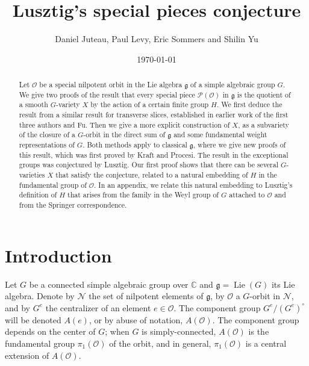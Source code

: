 \documentclass{amsart}
\title{Lusztig's special pieces conjecture}
\author{Daniel Juteau, Paul Levy, Eric Sommers and Shilin Yu}
\date{\today}
\theoremstyle{definition}
\DeclareMathOperator{\Lie}{Lie}
\newcommand{\C}{\mathbb{C}}
\newcommand{\g}{\mathfrak{g}}
\newcommand{\0}{\mathcal{O}}
\newcommand{\com}[1]{\textcolor{red}{#1}}
\begin{document}
\begin{abstract}
Let $\0$ be a special nilpotent orbit in the Lie algebra $\g$ of a simple algebraic group $G$.
We give two proofs of the result that every special piece ${\mathcal P}(\0)$ in $\g$
is the quotient of a smooth $G$-variety $X$ by the action of a certain finite group $H$.  
We first deduce the result from a similar result for transverse slices, established in earlier work of the first three authors and Fu.
Then we give a more explicit construction of $X$, as a subvariety of the closure of a $G$-orbit
in the direct sum of $\g$ and some fundamental weight representations of $G$.   
Both methods apply to classical $\g$, where we give new proofs of this result, which was first proved by Kraft and Procesi.
The result in the exceptional groups was conjectured by Lusztig.
Our first proof shows that there can be several $G$-varieties $X$ that satisfy the conjecture, related to a natural embedding of $H$
in the fundamental group of $\0$.  In an appendix, we relate this natural embedding to Lusztig's definition of $H$ that arises from the 
family in the Weyl group of $G$ attached to $\0$ and from the Springer correspondence.
\end{abstract}


\maketitle

\setcounter{section}{-1}

\section{Introduction}\label{introsec}
Let $G$ be a connected simple algebraic group over $\C$ and $\g=\Lie(G)$ its Lie algebra.
Denote by ${\mathcal N}$ the set of nilpotent elements of $\g$, by $\0$ a $G$-orbit in ${\mathcal N}$, and by $G^e$ the centralizer of an element $e\in \0$.
The component group $G^e/(G^e)^\circ$ will be denoted $A(e)$, or by abuse of notation, $A(\0)$.
The component group depends on the center of $G$; when $G$ is simply-connected, $A(\0)$ is the fundamental group $\pi_1(\0)$ of the orbit, and in general, $\pi_1(\0)$ is a central extension of $A(\0)$.
\end{document}
